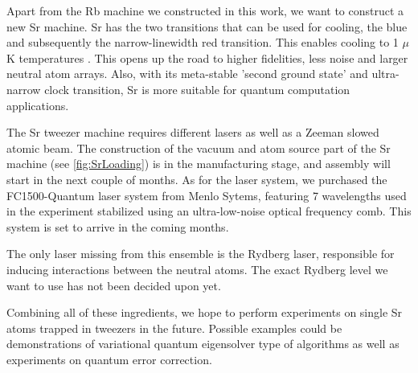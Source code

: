 \noindent Apart from the Rb machine we constructed in this work, we want to construct a new Sr machine.
Sr has the two transitions that can be used for cooling, the blue and subsequently the narrow-linewidth red transition.
This enables cooling to 1 $\mu$K temperatures \cite{Stellmer2013}.
This opens up the road to higher fidelities, less noise and larger neutral atom arrays. 
Also, with its meta-stable 'second ground state' and ultra-narrow clock transition, Sr is more suitable for quantum computation applications.

The Sr tweezer machine requires different lasers as well as a Zeeman slowed atomic beam. 
The construction of the vacuum and atom source part of the Sr machine (see \cref{fig:SrLoading}) is in the manufacturing stage, and assembly will start in the next couple of months. 
As for the laser system, we purchased the FC1500-Quantum laser system from Menlo Sytems, featuring 7 wavelengths used in the experiment stabilized using an ultra-low-noise optical frequency comb.
This system is set to arrive in the coming months.

The only laser missing from this ensemble is the Rydberg laser, responsible for inducing interactions between the neutral atoms.
The exact Rydberg level we want to use has not been decided upon yet. 

Combining all of these ingredients, we hope to perform experiments on single Sr atoms trapped in tweezers in the future.
Possible examples could be demonstrations of variational quantum eigensolver type of algorithms as well as experiments on quantum error correction. 



